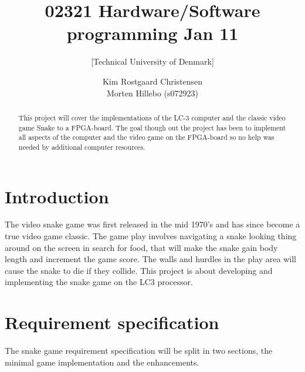 \documentclass{acm_proc_article-sp}
\begin{document}
\title{02321 Hardware/Software programming Jan 11}
\subtitle{[Technical University of Denmark]
}

\author{
\alignauthor 
Kim Rostgaard Christensen\\
\alignauthor 
Morten Hillebo (s072923)
}

\maketitle

\begin{abstract}
This project will cover the implementations of the LC-3 computer and the classic video game Snake to a FPGA-board. 
The goal though out the project has been to implement all aspects of the computer and the video game on the FPGA-board so no help was needed by additional computer resources.
\end{abstract}

\section{Introduction}
\label{sec:introduction}

The video snake game was first released in the mid 1970's and has since become a true video game classic. The game play involves navigating a snake looking thing around on the screen in search for food, that will make the snake gain body length and increment the game score. 
The walls and hurdles in the play area will cause the snake to die if they collide.
This project is about developing and implementing the snake game on the LC3 processor. 
%

\section{Requirement specification}
The snake game requirement specification will be split in two sections, the minimal game implementation and the enhancements. 
\end{document}
